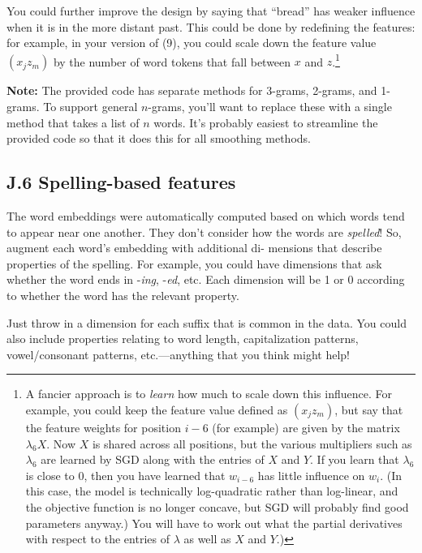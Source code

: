 You could further improve the design by saying that “bread” has weaker influence when it is in the more 
distant past. This could be done by redefining the features: for example, in your version of (9), you could 
scale down the feature value $(x_j z_m)$ by the number of word tokens that fall between $x$ and $z$.\footnote{A fancier approach is to \emph{learn} how much to scale down this influence. For example, you could keep the feature value defined as $(x_j z_m)$, but say that the feature weights for position $i-6$ (for example) are given by the matrix $\lambda_6 X$. Now $X$ is shared across all positions, but the various multipliers such as $\lambda_6$ are learned by SGD along with the entries of $X$ and $Y$. If you learn that $\lambda_6$ is close to 0, then you have learned that $w_{i-6}$ has little influence on $w_i$. (In this case, the model is technically log-quadratic rather than log-linear, and the objective function is no longer concave, but SGD will probably find good parameters anyway.) You will have to work out what the partial derivatives with respect to the entries of $\lambda$ as well as $X$ and $Y$.)}

\textbf{Note:} The provided code has separate methods for 3-grams, 2-grams, and 1-grams. To support general 
$n$-grams, you’ll want to replace these with a single method that takes a list of $n$ words. It’s probably easiest 
to streamline the provided code so that it does this for all smoothing methods. 

\subsection*{J.6 Spelling-based features}

The word embeddings were automatically computed based on which words tend to appear near one another. 
They don’t consider how the words are \emph{spelled}! So, augment each word’s embedding with additional di-
mensions that describe properties of the spelling. For example, you could have dimensions that ask whether 
the word ends in -\emph{ing}, -\emph{ed}, etc. Each dimension will be 1 or 0 according to whether the word has the 
relevant property. 

Just throw in a dimension for each suffix that is common in the data. You could also include properties 
relating to word length, capitalization patterns, vowel/consonant patterns, etc.—anything that you think 
might help! 

